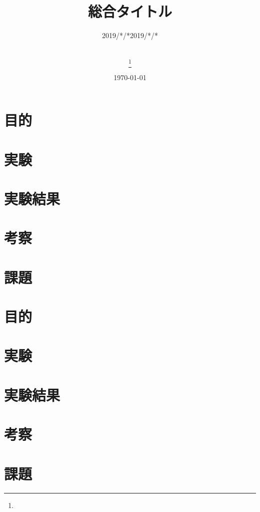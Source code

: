 \documentclass[11pt,a4j, titlepage]{jsarticle}
\title{総合タイトル}
\date{\today}
\author{
    \small{\myid} \\
    \myname\thanks{\mymail}
}
\begin{document}
\maketitle


\subtitle{2019/*/*}

\section{目的}
\section{実験}
\section{実験結果}
\section{考察}
\section{課題}


\newpage
\resetcounters


\subtitle{2019/*/*}

\section{目的}
\section{実験}
\section{実験結果}
\section{考察}
\section{課題}



\newpage
\thispagestyle{empty}
\nocite{Material}


\end{document}
